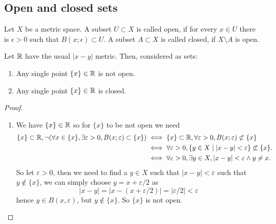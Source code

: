 \documentclass[10pt, a4paper]{article}
\begin{document}
\subsection{Open and closed sets}

\begin{definition}
    Let $X$ be a metric space.
    A subset $U \subset X$ is called open,
    if for every $x \in U$ there is $\epsilon > 0$ such that $B(x; \epsilon) \subset U$.
    A subset $A \subset X$ is called closed,
    if $X \setminus A$ is open.
\end{definition}

\begin{example}
    Let $\mathbb{R}$ have the usual $|x - y|$ metric.
    Then,
    considered as sets:
    
    \begin{enumerate}[label = \arabic*.]
        \item Any single point $\{x\} \in \mathbb{R}$ is not open.

        \item Any single point $\{x\} \in \mathbb{R}$ is closed.
    \end{enumerate}

    \begin{proof}
        \begin{enumerate}[label = \arabic*.]
            \item
            We have $\{x\} \in \mathbb{R}$ so for $\{x\}$ to be not open we need
            \begin{align*}
                \{x\} \subset \mathbb{R}, \neg(\forall x \in \{x\}, \exists \varepsilon > 0, B(x; \varepsilon) \subset \{x\}) &\iff \{x\} \subset \mathbb{R}, \forall \varepsilon > 0, B(x; \varepsilon) \not\subset \{x\} \\
                &\iff \forall \varepsilon > 0, \{y \in X \mid |x - y| < \varepsilon\} \not\subset \{x\}. \\
                &\iff \forall\varepsilon > 0, \exists y \in X, |x - y| < \varepsilon \wedge y \neq x.
            \end{align*}
            So let $\varepsilon > 0$,
            then we need to find a $y \in X$ such that $|x - y| < \varepsilon$ such that $y \notin \{x\}$,
            we can simply choose $y = x + \varepsilon / 2$ as
            \[
            |x - y| = |x - (x + \varepsilon / 2)| = |\varepsilon / 2| < \varepsilon
            \]
            hence $y \in B(x, \varepsilon)$,
            but $y \notin \{x\}$.
            So $\{x\}$ is not open.


\end{enumerate}
\end{proof}
\end{example}
\end{document}

